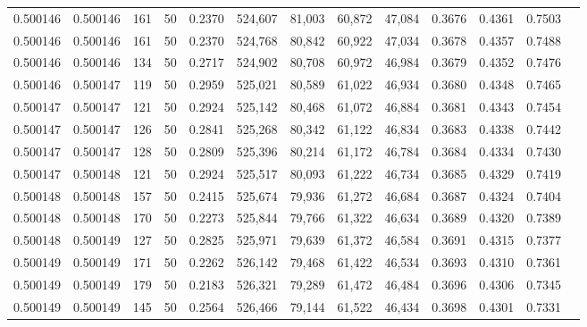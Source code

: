 \begin{tabular}{rrrrrrrrrrrrr}
0.500146 & 0.500146 &   161 &  50 &                                     0.2370 & 524,607 &  81,003 &  60,872 &  47,084 & 0.3676 & 0.4361 & 0.7503 \\
0.500146 & 0.500146 &   161 &  50 &                                     0.2370 & 524,768 &  80,842 &  60,922 &  47,034 & 0.3678 & 0.4357 & 0.7488 \\
0.500146 & 0.500146 &   134 &  50 &                                     0.2717 & 524,902 &  80,708 &  60,972 &  46,984 & 0.3679 & 0.4352 & 0.7476 \\
0.500146 & 0.500147 &   119 &  50 &                                     0.2959 & 525,021 &  80,589 &  61,022 &  46,934 & 0.3680 & 0.4348 & 0.7465 \\
0.500147 & 0.500147 &   121 &  50 &                                     0.2924 & 525,142 &  80,468 &  61,072 &  46,884 & 0.3681 & 0.4343 & 0.7454 \\
0.500147 & 0.500147 &   126 &  50 &                                     0.2841 & 525,268 &  80,342 &  61,122 &  46,834 & 0.3683 & 0.4338 & 0.7442 \\
0.500147 & 0.500147 &   128 &  50 &                                     0.2809 & 525,396 &  80,214 &  61,172 &  46,784 & 0.3684 & 0.4334 & 0.7430 \\
0.500147 & 0.500148 &   121 &  50 &                                     0.2924 & 525,517 &  80,093 &  61,222 &  46,734 & 0.3685 & 0.4329 & 0.7419 \\
0.500148 & 0.500148 &   157 &  50 &                                     0.2415 & 525,674 &  79,936 &  61,272 &  46,684 & 0.3687 & 0.4324 & 0.7404 \\
0.500148 & 0.500148 &   170 &  50 &                                     0.2273 & 525,844 &  79,766 &  61,322 &  46,634 & 0.3689 & 0.4320 & 0.7389 \\
0.500148 & 0.500149 &   127 &  50 &                                     0.2825 & 525,971 &  79,639 &  61,372 &  46,584 & 0.3691 & 0.4315 & 0.7377 \\
0.500149 & 0.500149 &   171 &  50 &                                     0.2262 & 526,142 &  79,468 &  61,422 &  46,534 & 0.3693 & 0.4310 & 0.7361 \\
0.500149 & 0.500149 &   179 &  50 &                                     0.2183 & 526,321 &  79,289 &  61,472 &  46,484 & 0.3696 & 0.4306 & 0.7345 \\
0.500149 & 0.500149 &   145 &  50 &                                     0.2564 & 526,466 &  79,144 &  61,522 &  46,434 & 0.3698 & 0.4301 & 0.7331 \\

\end{tabular}
